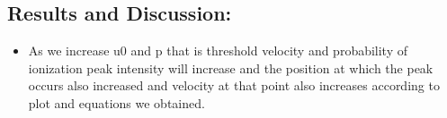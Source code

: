 \documentclass[10pt,notitlepage,onecolumn,aps,pra]{revtex4-1}
\providecommand{\tightlist}{%
      \setlength{\itemsep}{0pt}\setlength{\parskip}{0pt}}
\begin{document}
    \subsection{Results and Discussion:}\label{results-and-discussion}

\begin{itemize}
\tightlist
\item
  As we increase u0 and p that is threshold velocity and probability of
  ionization peak intensity will increase and the position at which the
  peak occurs also increased and velocity at that point also increases
  according to plot and equations we obtained.
\end{itemize}


    
    


    
    
\end{document}
